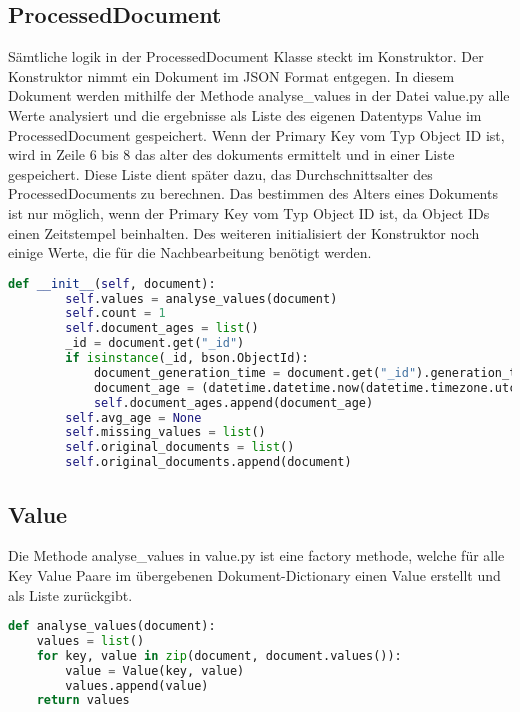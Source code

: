 \subsection{ProcessedDocument}
\label{sub:ba_processed_document}

Sämtliche logik in der ProcessedDocument Klasse steckt im Konstruktor.
Der Konstruktor nimmt ein Dokument im JSON Format entgegen.
In diesem Dokument werden mithilfe der Methode analyse\_values in der Datei value.py alle Werte analysiert und die ergebnisse als Liste des eigenen Datentyps Value im ProcessedDocument gespeichert.
Wenn der Primary Key vom Typ Object ID ist, wird in Zeile 6 bis 8 das alter des dokuments ermittelt und in einer Liste gespeichert.
Diese Liste dient später dazu, das Durchschnittsalter des ProcessedDocuments zu berechnen.
Das bestimmen des Alters eines Dokuments ist nur möglich, wenn der Primary Key vom Typ Object ID ist, da Object IDs einen Zeitstempel beinhalten.
Des weiteren initialisiert der Konstruktor noch einige Werte, die für die Nachbearbeitung benötigt werden.


\begin{lstlisting}[language=python, caption={ProcessedDocument.\_\_init\_\_},label={lst:backend_processed_document_init}]
    def __init__(self, document):
        self.values = analyse_values(document)
        self.count = 1
        self.document_ages = list()
        _id = document.get("_id")
        if isinstance(_id, bson.ObjectId):
            document_generation_time = document.get("_id").generation_time
            document_age = (datetime.datetime.now(datetime.timezone.utc) - document_generation_time).total_seconds()
            self.document_ages.append(document_age)
        self.avg_age = None
        self.missing_values = list()
        self.original_documents = list()
        self.original_documents.append(document)
\end{lstlisting}

\subsection{Value}
\label{sub:ba_value}

Die Methode analyse\_values in value.py ist eine factory methode, welche für alle Key Value Paare im übergebenen Dokument-Dictionary einen Value erstellt und als Liste zurückgibt.

\begin{lstlisting}[language=python, caption={Value.analyse\_values},label={lst:backend_value_analyse_values}]
def analyse_values(document):
    values = list()
    for key, value in zip(document, document.values()):
        value = Value(key, value)
        values.append(value)
    return values
\end{lstlisting}

